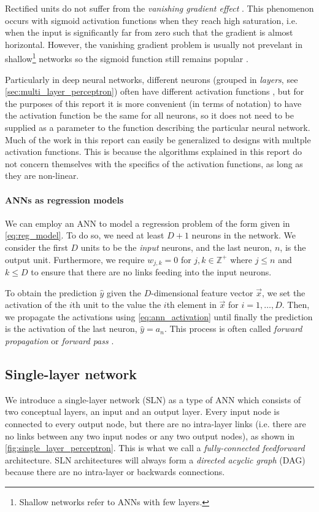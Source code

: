 Rectified units do not suffer from the \textit{vanishing gradient effect} \cite{glorot2011}.
This phenomenon occurs with sigmoid activation functions when they reach high saturation, i.e. when the input is significantly far from zero such that the gradient is almost horizontal.
However, the vanishing gradient problem is usually not prevelant in shallow\footnote{Shallow networks refer to ANNs with few layers.} networks so the sigmoid function still remains popular \cite{neal1992}.

Particularly in deep neural networks, different neurons (grouped in \textit{layers}, see \ref{sec:multi_layer_perceptron}) often have different activation functions \cite{burkov2019}, but for the purposes of this report it is more convenient (in terms of notation) to have the activation function be the same for all neurons, so it does not need to be supplied as a parameter to the function describing the particular neural network.
Much of the work in this report can easily be generalized to designs with multple activation functions.
This is because the algorithms explained in this report do not concern themselves with the specifics of the activation functions, as long as they are non-linear.

\paragraph{ANNs as regression models}
We can employ an ANN to model a regression problem of the form given in \ref{eq:reg_model}. 
To do so, we need at least $D+1$ neurons in the network. 
We consider the first $D$ units to be the \textit{input} neurons, and the last neuron, $n$, is the output unit.
Furthermore, we require $w_{j,k}=0$ for $j,k \in \mathbb{Z}^+$ where $j \leq n$ and $k \leq D$ to ensure that there are no links feeding into the input neurons.

To obtain the prediction $\hat{y}$ given the $D$-dimensional feature vector $\vec{x}$, we set the activation of the $i$th unit to the value the $i$th element in $\vec{x}$ for $i=1,\dots,D$.
Then, we propagate the activations using \ref{eq:ann_activation} until finally the prediction is the activation of the last neuron, $\hat{y}=a_n$.
This process is often called \textit{forward propagation} or \textit{forward pass} \cite{burkov2019}.

\subsection{Single-layer network}
We introduce a single-layer network (SLN) as a type of ANN which consists of two conceptual layers, an input and an output layer.
Every input node is connected to every output node, but there are no intra-layer links (i.e. there are no links between any two input nodes or any two output nodes), as shown in \ref{fig:single_layer_perceptron}. 
This is what we call a \textit{fully-connected feedforward} architecture.
SLN architectures will always form a \textit{directed acyclic graph} (DAG) because there are no intra-layer or backwards connections.

